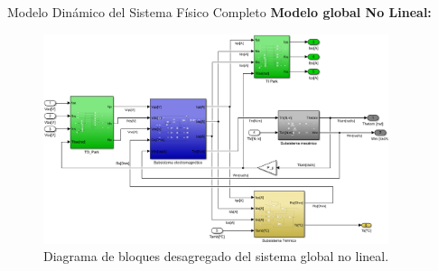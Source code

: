 \documentclass[12pt]{beamer}
\begin{document}
\begin{frame}{Modelo Dinámico del Sistema Físico Completo}\footnotesize
\textbf{Modelo global No Lineal:}
    \begin{figure}[H]
        \centering
        \includegraphics[width=0.9\textwidth]{Imagenes/Diagrama_Global_NoLineal.png}
        \caption{Diagrama de bloques desagregado del sistema global no lineal.}
    \end{figure}
\end{frame}
\end{document}

